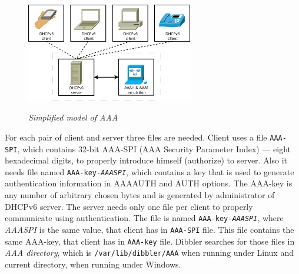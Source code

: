 \begin{figure}[ht]
\begin{center}
\label{fig-aaa}
\includegraphics[width=0.65\textwidth]{dibbler-aaa}
\caption{\emph{Simplified model of AAA}}
\end{center}
\end{figure}

For each pair of client and server three files are needed. Client uses
a file \texttt{AAA-SPI}, which contains 32-bit AAA-SPI (AAA Security
Parameter Index) --- eight hexadecimal digits, to properly introduce
himself (authorize) to server. Also it needs file named \texttt{AAA-key-\textit{AAASPI}},
which contains a key that is used to generate authentication information
in AAAAUTH and AUTH options. The AAA-key is any number of arbitrary chosen
bytes and is generated by administrator of DHCPv6 server. The server needs
only one file per client to properly communicate using authentication. The
file is named \texttt{AAA-key-\textit{AAASPI}}, where \textit{AAASPI} is the
same value, that client has in \texttt{AAA-SPI} file. This file contains the
same AAA-key, that client has in \texttt{AAA-key} file. Dibbler searches for
those files in \textit{AAA directory}, which is \texttt{/var/lib/dibbler/AAA}
when running under Linux and current directory, when running under Windows.

